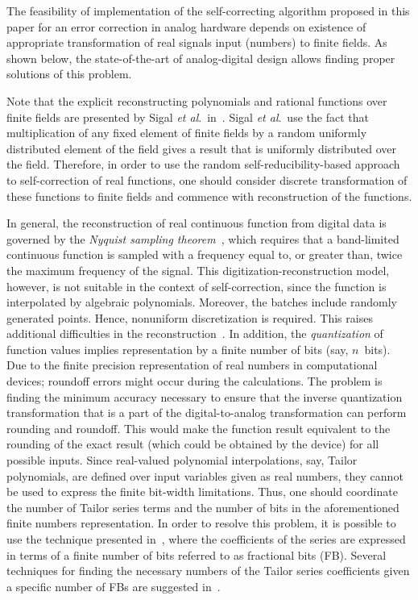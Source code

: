 \begin{multicols}{2}
\noindent
   The feasibility of implementation of the self-correcting algorithm proposed in this paper
    for an error correction in analog hardware
    depends on existence of appropriate transformation of real signals input (numbers) to finite fields.  
As shown below, the state-of-the-art of analog-digital design allows finding proper solutions of this problem.   
   
       Note that the explicit reconstructing polynomials and rational functions over finite fields are presented by Sigal 
\textit{et al}.\ in~\cite{3-dol}. 
Sigal \textit{et al}.\ use the fact that multiplication of any fixed element of 
finite fields by a random uniformly distributed element of the field gives a result that is uniformly distributed over the 
field. Therefore, in order to use the random self-reducibility-based approach to self-correction of real functions, one 
should consider discrete transformation of these functions to finite fields and commence with reconstruction of the 
functions. 
   
   In general, the reconstruction of real continuous function from digital data is governed by the \textit{Nyquist 
sampling theorem}~\cite{6-dol}, which requires that a band-limited continuous function is sampled with a frequency 
equal to, or greater than, twice the maximum frequency of the signal. This digitization-reconstruction model, however, is 
not suitable in the context of self-correction, since the function is interpolated by algebraic polynomials.  Moreover, the 
batches include randomly generated points. Hence, nonuniform discretization is required. This raises additional 
difficulties in the reconstruction~\cite{8-dol}. In addition, the \textit{quantization} of function values implies 
representation by a finite number of bits (say, $n$~bits). Due to the finite precision representation of real numbers in 
computational devices; roundoff errors might occur during the calculations. The problem is finding the minimum 
accuracy necessary to ensure that the inverse quantization transformation that is a part of the 
digital-to-analog 
transformation can perform rounding and roundoff. This would make the function result equivalent to the rounding of 
the exact result (which could be obtained by the device) for all possible inputs. Since real-valued polynomial 
interpolations, say, Tailor polynomials, are defined over input variables given as real numbers, they cannot be used to 
express the finite bit-width limitations. Thus, one should coordinate the number of Tailor series 
terms and the number of bits in 
the aforementioned finite numbers representation. In order to resolve this problem, it is possible to use the technique 
presented in~\cite{12-dol}, where the coefficients of the series are expressed in terms of a finite number of bits referred 
to as fractional bits (FB). Several techniques for finding the necessary numbers of the Tailor series coefficients given a 
specific number of FBs are suggested in~\cite{12-dol}.
     

\end{multicols}
